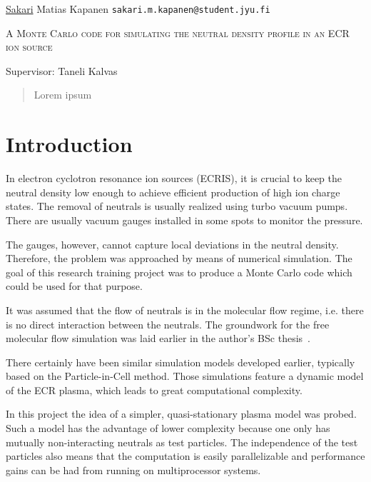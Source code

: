\documentclass[a4paper,twoside,12pt]{article}
\begin{document}
\thispagestyle{empty}
\begin{flushleft}
 \underline{Sakari} Matias Kapanen\hfill
 \texttt{sakari.m.kapanen@student.jyu.fi}
\end{flushleft}
\vfill
\begin{center}
\textsc{\LARGE A Monte Carlo code for simulating the neutral density profile in an ECR ion source}
\end{center}
\vfill
Supervisor: Taneli Kalvas\\
\vfill
\begin{abstract}
 \noindent
    Lorem ipsum
\end{abstract}
\clearpage%

\setlength{\parindent}{0pt}
\setlength{\parskip}{12pt}

\setcounter{page}{1}

\section{Introduction}
In electron cyclotron resonance ion sources (ECRIS), it is crucial to keep the neutral density low enough to achieve efficient production of high ion charge states. The removal of neutrals is usually realized using turbo vacuum pumps. There are usually vacuum gauges installed in some spots to monitor the pressure.

The gauges, however, cannot capture local deviations in the neutral density. Therefore, the problem was approached by means of numerical simulation. The goal of this research training project was to produce a Monte Carlo code which could be used for that purpose.

It was assumed that the flow of neutrals is in the molecular flow regime, i.e. there is no direct interaction between the neutrals. The groundwork for the free molecular flow simulation was laid earlier in the author's BSc thesis~\cite{kapanen:bsc}.

There certainly have been similar simulation models developed earlier, typically based on the Particle-in-Cell method. Those simulations feature a dynamic model of the ECR plasma, which leads to great computational complexity.

In this project the idea of a simpler, quasi-stationary plasma model was probed. Such a model has the advantage of lower complexity because one only has mutually non-interacting neutrals as test particles. The independence of the test particles also means that the computation is easily parallelizable and performance gains can be had from running on multiprocessor systems.
\end{document}
